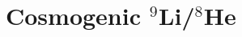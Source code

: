 \documentclass[../thesis.tex]{subfiles}
\begin{document}
\begin{comment}
As previously stated, the accidental background can be straightforwardly measured based on the characteristics of singles events. The singles spectrum is first measured by searching for prompt-like events that satisfy the usual muon vetos but are separated from other prompt-like events by at least 400~$\mu$s. The total integral of this spectrum gives the prompt-like rate $R_p$, while the integral above 6~MeV gives the delayed-like rate $R_d$. The accidental background rate is then simply
\[ R_\mathrm{acc} = R_d(1 - e^{-R_p\Delta t})e^{-2R_p\Delta t}, \] where the factor in parentheses is the probability for a prompt-like single to fall within the $\Delta t$~=~200~$\mu$s preceding a delayed-like single, and the final factor is the probability that the event is \emph{not} rejected by the decoupled multiplicity cut, which disallows any additional prompt-like single in the 400~$\mu$s preceding the delayed event. Once the rate has been determined this way, the spectrum is trivial: It is simply the singles spectrum itself.
\end{comment}

\begin{comment}
  Mention IHEP's cross-check, and the additional uncertainty stemming from the difference between it and the nominal result?
\end{comment}

\section{Cosmogenic $^9$Li/$^8$He}
\label{sec:bkgCosmo}

\newcommand\linine{$^9$Li}
\end{document}

